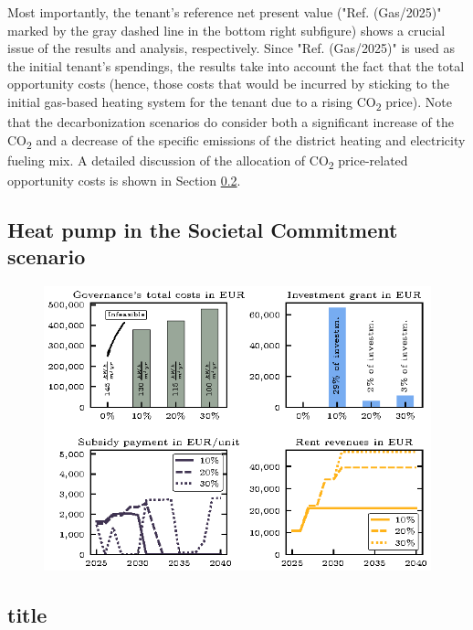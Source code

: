 Most importantly, the tenant's reference net present value ("Ref. (Gas/2025)" marked by the gray dashed line in the bottom right subfigure) shows a crucial issue of the results and analysis, respectively. Since "Ref. (Gas/2025)" is used as the initial tenant's spendings, the results take into account the fact that the total opportunity costs (hence, those costs that would be incurred by sticking to the initial gas-based heating system for the tenant due to a rising CO\textsubscript{2} price). Note that the decarbonization scenarios do consider both a significant increase of the CO\textsubscript{2} and a decrease of the specific emissions of the district heating and electricity fueling mix. A detailed discussion of the allocation of CO\textsubscript{2} price-related opportunity costs is shown in Section \ref{res:co2_shares}.

\subsection{Heat pump in the Societal Commitment scenario}\label{res:heat_pump}
\begin{figure}[h]
	\centering
	\includegraphics[width=1\linewidth]{figures/4_Results/fig_retrofitting/retrofitting.eps}
	\caption{}
	\label{fig:retrofitting}
\end{figure}
\subsection{title}\label{res:co2_shares}















